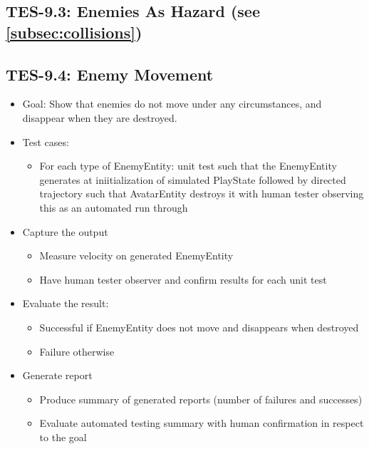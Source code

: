 \subsection{TES-9.3: Enemies As Hazard (see \ref{subsec:collisions})}

\subsection{TES-9.4: Enemy Movement }
\begin{itemize}
\item Goal: Show that enemies do not move under any circumstances, and disappear when they are destroyed.

\item Test cases: 
\begin{itemize}
\item For each type of EnemyEntity: unit test such that the EnemyEntity generates at iniitialization of simulated PlayState followed by directed trajectory such that AvatarEntity destroys it with human tester observing this as an automated run through
\end{itemize}

\item Capture the output 
\begin{itemize}
\item Measure velocity on generated EnemyEntity
\item Have human tester observer and confirm results for each unit test
\end{itemize}

\item Evaluate the result: 
\begin{itemize}
\item Successful if EnemyEntity does not move and disappears when destroyed
\item Failure otherwise
\end{itemize}

\item Generate report 
\begin{itemize}
\item Produce summary of generated reports (number of failures and successes)
\item Evaluate automated testing summary with human confirmation in respect to the goal
\end{itemize}
\end{itemize}

